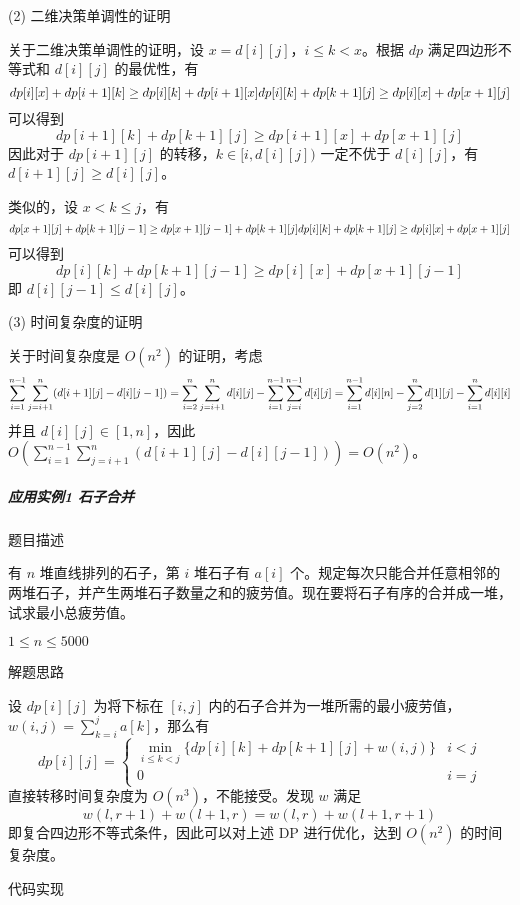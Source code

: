 (2) 二维决策单调性的证明

关于二维决策单调性的证明，设 \(x=d[i][j]\)，\(i\le k\lt x\)。根据 \(dp\)
满足四边形不等式和 \(d[i][j]\) 的最优性，有 \[
dp[i][x]+dp[i+1][k]\ge dp[i][k]+dp[i+1][x]\\
dp[i][k]+dp[k+1][j]\ge dp[i][x]+dp[x+1][j]
\] 可以得到 \[
dp[i+1][k]+dp[k+1][j]\ge dp[i+1][x]+dp[x+1][j]
\] 因此对于 \(dp[i+1][j]\) 的转移，\(k\in [i,d[i][j])\) 一定不优于
\(d[i][j]\)，有 \(d[i+1][j]\ge d[i][j]\)。

类似的，设 \(x\lt k\le j\)，有 \[
dp[x+1][j]+dp[k+1][j-1]\ge dp[x+1][j-1]+dp[k+1][j]\\
dp[i][k]+dp[k+1][j]\ge dp[i][x]+dp[x+1][j]
\] 可以得到 \[
dp[i][k]+dp[k+1][j-1]\ge dp[i][x]+dp[x+1][j-1]
\] 即 \(d[i][j-1]\le d[i][j]\)。

(3) 时间复杂度的证明

关于时间复杂度是 \(O(n^2)\) 的证明，考虑 \[
\sum_{i=1}^{n-1}\sum_{j=i+1}^n(d[i+1][j]-d[i][j-1])\\
=\sum_{i=2}^n\sum_{j=i+1}^nd[i][j]-\sum_{i=1}^{n-1}\sum_{j=i}^{n-1}d[i][j]\\
=\sum_{i=1}^{n-1}d[i][n]-\sum_{j=2}^nd[1][j]-\sum_{i=1}^nd[i][i]
\] 并且 \(d[i][j]\in[1,n]\)，因此
\(O(\sum_{i=1}^{n-1}\sum_{j=i+1}^n(d[i+1][j]-d[i][j-1]))=O(n^2)\)。

\subparagraph{应用实例1 石子合并}

题目描述

有 \(n\) 堆直线排列的石子，第 \(i\) 堆石子有 \(a[i]\)
个。规定每次只能合并任意相邻的两堆石子，并产生两堆石子数量之和的疲劳值。现在要将石子有序的合并成一堆，试求最小总疲劳值。

\(1\le n\le 5000\)

解题思路

设 \(dp[i][j]\) 为将下标在 \([i,j]\)
内的石子合并为一堆所需的最小疲劳值，\(w(i,j)=\sum_{k=i}^ja[k]\)，那么有
\[
dp[i][j]=
\begin{cases}
\min_{i\le k\lt j}\{dp[i][k]+dp[k+1][j]+w(i,j)\}&i\lt j\\[2ex]
0&i=j
\end{cases}
\] 直接转移时间复杂度为 \(O(n^3)\)，不能接受。发现 \(w\) 满足 \[
w(l,r+1)+w(l+1,r)=w(l,r)+w(l+1,r+1)
\] 即复合四边形不等式条件，因此可以对上述 DP 进行优化，达到 \(O(n^2)\)
的时间复杂度。

代码实现

